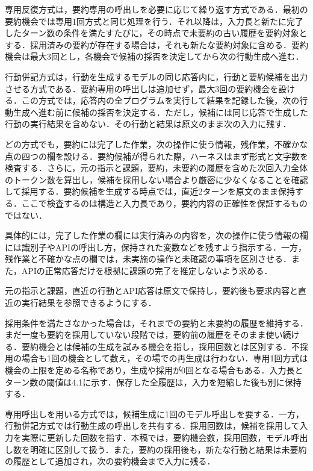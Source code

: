 \documentclass[letter]{ieicej}
\begin{document}
専用反復方式は，要約専用の呼出しを必要に応じて繰り返す方式である．最初の要約機会では専用1回方式と同じ処理を行う．それ以降は，入力長と新たに完了したターン数の条件を満たすたびに，その時点で未要約の古い履歴を要約対象とする．採用済みの要約が存在する場合は，それも新たな要約対象に含める．要約機会は最大3回とし，各機会で候補の採否を決定してから次の行動生成へ進む．

行動併記方式は，行動を生成するモデルの同じ応答内に，行動と要約候補を出力させる方式である．要約専用の呼出しは追加せず，最大3回の要約機会を設ける．この方式では，応答内の全プログラムを実行して結果を記録した後，次の行動生成へ進む前に候補の採否を決定する．ただし，候補には同じ応答で生成した行動の実行結果を含めない．その行動と結果は原文のまま次の入力に残す．

どの方式でも，要約には完了した作業，次の操作に使う情報，残作業，不確かな点の四つの欄を設ける．要約候補が得られた際，ハーネスはまず形式と文字数を検査する．さらに，元の指示と課題，要約，未要約の履歴を含めた次回入力全体のトークン数を算出し，候補を採用しない場合より厳密に少なくなることを確認して採用する．要約候補を生成する時点では，直近2ターンを原文のまま保持する．ここで検査するのは構造と入力長であり，要約内容の正確性を保証するものではない．

具体的には，完了した作業の欄には実行済みの内容を，次の操作に使う情報の欄には識別子やAPIの呼出し方，保持された変数などを残すよう指示する．一方，残作業と不確かな点の欄では，未実施の操作と未確認の事項を区別させる．また，APIの正常応答だけを根拠に課題の完了を推定しないよう求める．

元の指示と課題，直近の行動とAPI応答は原文で保持し，要約後も要求内容と直近の実行結果を参照できるようにする．

採用条件を満たさなかった場合は，それまでの要約と未要約の履歴を維持する．まだ一度も要約を採用していない段階では，要約前の履歴をそのまま使い続ける．要約機会とは候補の生成を試みる機会を指し，採用回数とは区別する．不採用の場合も1回の機会として数え，その場での再生成は行わない．専用1回方式は機会の上限を定める名称であり，生成や採用が0回となる場合もある．入力長とターン数の閾値は4.1に示す．保存した全履歴は，入力を短縮した後も別に保持する．

専用呼出しを用いる方式では，候補生成に1回のモデル呼出しを要する．一方，行動併記方式では行動生成の呼出しを共有する．採用回数は，候補を採用して入力を実際に更新した回数を指す．本稿では，要約機会数，採用回数，モデル呼出し数を明確に区別して扱う．また，要約の採用後も，新たな行動と結果は未要約の履歴として追加され，次の要約機会まで入力に残る．
\end{document}
